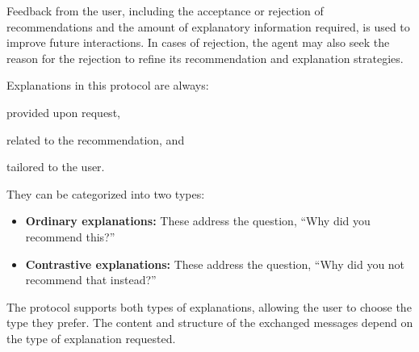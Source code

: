 Feedback from the user, including the acceptance or rejection of recommendations and the amount of explanatory information required, is used to improve future interactions.
%
In cases of rejection, the agent may also seek the reason for the rejection to refine its recommendation and explanation strategies.


Explanations in this protocol are always:
%
\begin{inlinelist}
    \item provided upon request,
    \item related to the recommendation, and
    \item tailored to the user.
\end{inlinelist}
%
They can be categorized into two types:
%
\begin{itemize}
    \item \textbf{Ordinary explanations:} These address the question, ``Why did you recommend this?''
    \item \textbf{Contrastive explanations:} These address the question, ``Why did you not recommend that instead?''
\end{itemize}
%
The protocol supports both types of explanations, allowing the user to choose the type they prefer.
%
The content and structure of the exchanged messages depend on the type of explanation requested.



